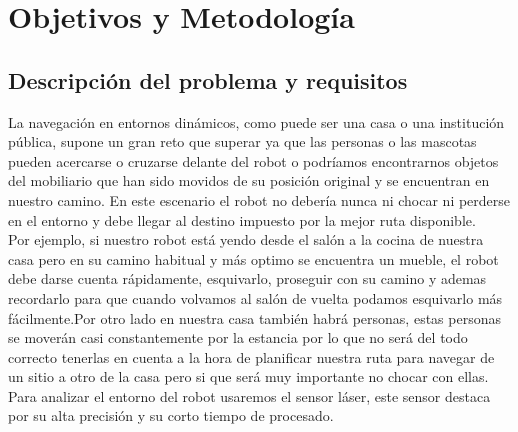 \chapter{Objetivos y Metodología}
\label{cap:objetivos}


\section{Descripción del problema y requisitos}
\label{sec:descripciondelproblema}

La navegación en entornos dinámicos, como puede ser una casa o una institución pública, supone un gran reto que superar ya que las personas o las mascotas pueden acercarse o cruzarse delante del robot o podríamos encontrarnos objetos del mobiliario que han sido movidos de su posición original y se encuentran en nuestro camino. En este escenario el robot no debería nunca ni chocar ni perderse en el entorno y debe llegar al destino impuesto por la mejor ruta disponible.\\

Por ejemplo, si nuestro robot está yendo desde el salón a la cocina de nuestra casa pero en su camino habitual y más optimo se encuentra un mueble, el robot debe darse cuenta rápidamente, esquivarlo, proseguir con su camino y ademas recordarlo para que cuando volvamos al salón de vuelta podamos esquivarlo más fácilmente.Por otro lado en nuestra casa también habrá personas, estas personas se moverán casi constantemente por la estancia por lo que no será del todo correcto tenerlas en cuenta a la hora de planificar nuestra ruta para navegar de un sitio a otro de la casa pero si que será muy importante no chocar con ellas.\\

Para analizar el entorno del robot usaremos el sensor láser, este sensor destaca por su alta precisión y su corto tiempo de procesado.\\


